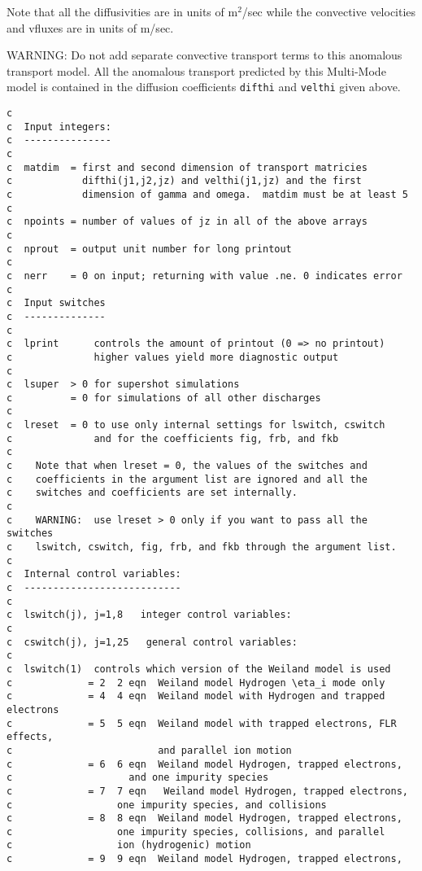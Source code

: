 Note that all the diffusivities are in units of m$^2$/sec while the
convective velocities and vfluxes are in units of m/sec.

WARNING:  Do not add separate convective transport terms to this
anomalous transport model.  All the anomalous transport 
predicted by this Multi-Mode model is contained
in the diffusion coefficients {\tt difthi} and {\tt velthi} given
above.

\begin{verbatim}
c
c  Input integers:
c  ---------------
c
c  matdim  = first and second dimension of transport matricies
c            difthi(j1,j2,jz) and velthi(j1,jz) and the first 
c            dimension of gamma and omega.  matdim must be at least 5
c
c  npoints = number of values of jz in all of the above arrays
c
c  nprout  = output unit number for long printout
c
c  nerr    = 0 on input; returning with value .ne. 0 indicates error
c
c  Input switches
c  --------------
c
c  lprint      controls the amount of printout (0 => no printout)
c              higher values yield more diagnostic output
c
c  lsuper  > 0 for supershot simulations
c          = 0 for simulations of all other discharges
c
c  lreset  = 0 to use only internal settings for lswitch, cswitch
c              and for the coefficients fig, frb, and fkb
c
c    Note that when lreset = 0, the values of the switches and
c    coefficients in the argument list are ignored and all the 
c    switches and coefficients are set internally.
c
c    WARNING:  use lreset > 0 only if you want to pass all the switches
c    lswitch, cswitch, fig, frb, and fkb through the argument list.
c
c  Internal control variables:
c  ---------------------------
c
c  lswitch(j), j=1,8   integer control variables: 
c
c  cswitch(j), j=1,25   general control variables:
c
c  lswitch(1)  controls which version of the Weiland model is used
c             = 2  2 eqn  Weiland model Hydrogen \eta_i mode only
c             = 4  4 eqn  Weiland model with Hydrogen and trapped electrons
c             = 5  5 eqn  Weiland model with trapped electrons, FLR effects, 
c                         and parallel ion motion
c             = 6  6 eqn  Weiland model Hydrogen, trapped electrons,
c                    and one impurity species
c             = 7  7 eqn   Weiland model Hydrogen, trapped electrons,
c                  one impurity species, and collisions
c             = 8  8 eqn  Weiland model Hydrogen, trapped electrons,
c                  one impurity species, collisions, and parallel
c                  ion (hydrogenic) motion
c             = 9  9 eqn  Weiland model Hydrogen, trapped electrons,

\end{verbatim}
